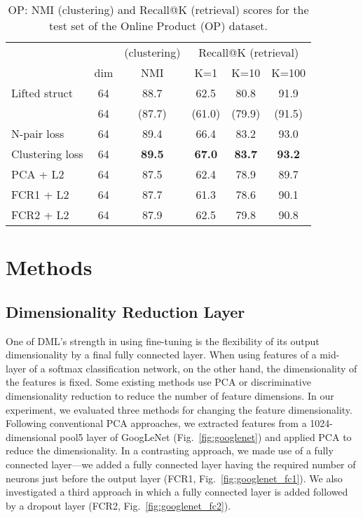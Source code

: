 \documentclass[9pt,technote,compsoc]{./sty/IEEEtran}
\newcommand{\Fref}[1]{Fig.~\ref{#1}}
\begin{document}
\begin{table*}
	\centering
	\caption{OP: NMI (clustering) and Recall@K (retrieval) scores for the test set of the Online Product (OP) dataset.}
	\label{tbl:OP}
	\begin{tabular}{lccccc}\toprule
		&&(clustering)&\multicolumn{3}{c}{Recall@K (retrieval)}\\\cmidrule(lr){4-6}
		&dim&NMI&K=1&K=10&K=100\\\midrule
		Lifted struct \cite{song2016deep}&64&88.7&62.5&80.8&91.9\\
		                                             &64&(87.7)&(61.0)&(79.9)&(91.5)\\
		N-pair loss \cite{sohn2016improved}&64&89.4&66.4&83.2&93.0\\
		Clustering loss \cite{song2017learnable}&64&\textbf{89.5}&\textbf{67.0}&\textbf{83.7}&\textbf{93.2}\\
		PCA + L2&64&87.5&62.4&78.9&89.7\\
		FCR1 + L2&64&87.7&61.3&78.6&90.1\\
		FCR2 + L2&64&87.9&62.5&79.8&90.8\\\bottomrule
	\end{tabular}
\end{table*}

\section{Methods}

\subsection{Dimensionality Reduction Layer}
\label{sec:dimensionaliry_reduction_layer}

One of DML's strength in using fine-tuning is the flexibility of its output dimensionality by a final fully connected layer.
When using features of a mid-layer of a softmax classification network, on the other hand, the dimensionality of the features is fixed.
Some existing methods \cite{babenko2014neural} use PCA or discriminative dimensionality reduction to reduce the number of feature dimensions.
In our experiment, we evaluated three methods for changing the feature dimensionality.
Following conventional PCA approaches, we extracted features from a 1024-dimensional pool5 layer of GoogLeNet \cite{szegedy2015going} (\Fref{fig:googlenet}) and applied PCA to reduce the dimensionality.
In a contrasting approach, we made use of a fully connected layer---we added a fully connected layer having the required
number of neurons just before the output layer (FCR1, \Fref{fig:googlenet_fc1}).
We also investigated a third approach in which a fully connected layer is added followed by a dropout layer (FCR2, \Fref{fig:googlenet_fc2}).
\end{document}
